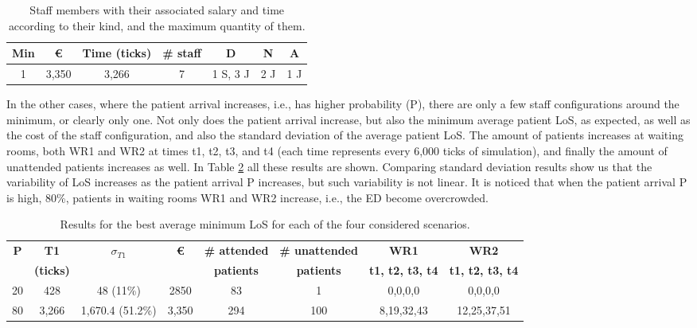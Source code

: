 \documentclass[11pt]{article} %
\begin{document}
\begin{table}[htb!]
\centering
\caption{Staff members with their associated salary and time according to their kind, and the maximum quantity of them.}
\resizebox{2.8in}{!} {
\begin{tabular}{ccccccc}
\hline
\bf {Min}  & \bf {\euro} & \bf {Time (ticks)}  & \bf {\# staff} & \bf {D}  & \bf {N} & \bf {A}  \\ \hline
1 & 3,350 & 3,266 & 7 & 1 S, 3 J  & 2 J  & 1 J  \\ \hline
\end{tabular}
}
\label{tab:T3}
\end{table}

In the other cases, where the patient arrival increases, i.e., has higher probability (P), there are only a few staff configurations 
around the minimum, or clearly only one. Not only does the patient arrival increase, but also the minimum average patient LoS, as 
expected, as well as the cost of the staff configuration, and also the standard deviation of the average patient LoS. The amount of 
patients increases at waiting rooms, both WR1 and WR2 at times t1, t2, t3, and t4 (each time represents every 6,000 ticks of 
simulation), and finally the amount of unattended patients increases as well. In Table \ref{tab:20_80_I1} all these results are shown. 
Comparing standard deviation results show us that the variability of LoS increases as the  patient arrival P increases, but such 
variability is not linear. It is noticed that when the patient arrival P is high, 80\%, patients in waiting rooms WR1 and WR2 increase, 
i.e., the ED become overcrowded. 

\begin{table}[htb!]
\caption{Results for the best average minimum LoS for each of the four considered scenarios.}
\small\addtolength{\tabcolsep}{-5pt}
\centering
\resizebox{3.6in}{!} {
\begin{tabular}{cccccccc}
\hline
\multicolumn{ 1}{c}{\bf {P}} & \multicolumn{ 1}{c}{\bf {T1} } & \multicolumn{ 1}{c}{ \bf {$\sigma_{T1}$} } & \multicolumn{ 1}{c}{\bf {\euro} } & \multicolumn{ 1}{c}{\bf {\# attended} } & \multicolumn{ 1}{c}{\bf {\# unattended} } & \bf {WR1} & \bf {WR2} \\ \cline{ 7- 8}
\multicolumn{ 1}{c}{} & \multicolumn{ 1}{c}{\bf{(ticks)}} & \multicolumn{ 1}{c}{} & \multicolumn{ 1}{c}{} & \multicolumn{ 1}{c}{\bf {patients}} & \multicolumn{ 1}{c}{\bf {patients}} & \bf {t1, t2, t3, t4}  & \bf {t1, t2, t3, t4}  \\ \hline
20 & 428 & 48 (11\%)  & 2850 & 83 & 1 & 0,0,0,0  & 0,0,0,0  \\ \hline
80 & 3,266 & 1,670.4  (51.2\%)  & 3,350 & 294 & 100 & 8,19,32,43  & 12,25,37,51  \\ \hline
\end{tabular}
}
\label{tab:20_80_I1}
\end{table}
\end{document}
